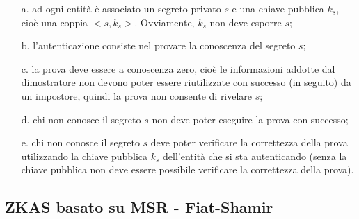 \begin{itemize}
\item[a.] ad ogni entità è associato un segreto privato $s$ e
una chiave pubblica $k_{s}$, cioè una coppia $<s, k_{s}>$. Ovviamente, $k_{s}$ non deve esporre $s$;
\item[b.] l'autenticazione consiste nel provare la conoscenza del segreto $s$;
\item[c.] la prova deve essere a conoscenza zero, cioè le informazioni addotte dal dimostratore non devono poter essere riutilizzate con successo (in seguito) da un impostore, quindi la prova non consente di rivelare $s$;
\item[d.] chi non conosce il segreto $s$ non deve poter eseguire la prova con successo;
\item[e.] chi non conosce il segreto $s$ deve poter verificare la correttezza della prova utilizzando la chiave pubblica $k_{s}$ dell'entità che si sta autenticando (senza la chiave pubblica non deve essere possibile verificare la correttezza della prova).
\end{itemize}

\subsection{ZKAS basato su MSR - Fiat-Shamir}


